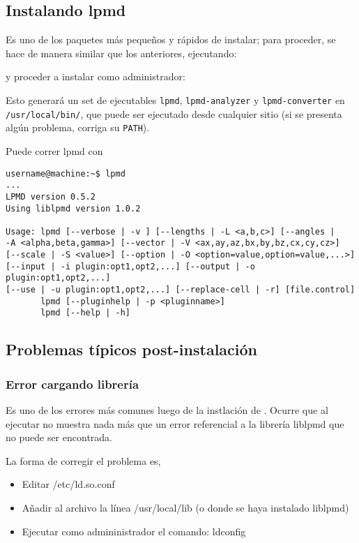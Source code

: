 \subsection{Instalando lpmd}

Es uno de los paquetes m\'as peque\~nos y r\'apidos de instalar; para proceder, se hace de manera similar que los anteriores, ejecutando:


y proceder a instalar como administrador:


Esto generar\'a un set de ejecutables \verb|lpmd|, \verb|lpmd-analyzer| y \verb|lpmd-converter| en \verb|/usr/local/bin/|, que puede ser ejecutado desde cualquier sitio (si se presenta alg\'un problema, corriga su \verb|PATH|).

Puede correr lpmd con

\begin{verbatim}
username@machine:~$ lpmd
...
LPMD version 0.5.2
Using liblpmd version 1.0.2

Usage: lpmd [--verbose | -v ] [--lengths | -L <a,b,c>] [--angles | 
-A <alpha,beta,gamma>] [--vector | -V <ax,ay,az,bx,by,bz,cx,cy,cz>] 
[--scale | -S <value>] [--option | -O <option=value,option=value,...>] 
[--input | -i plugin:opt1,opt2,...] [--output | -o plugin:opt1,opt2,...] 
[--use | -u plugin:opt1,opt2,...] [--replace-cell | -r] [file.control]
       lpmd [--pluginhelp | -p <pluginname>]
       lpmd [--help | -h]
\end{verbatim}

\subsection{Problemas t\'ipicos post-instalaci\'on}

\subsubsection{Error cargando librer\'ia}

Es uno de los errores m\'as comunes luego de la instlaci\'on de \lpmd. Ocurre que al ejecutar \lpmd no muestra nada m\'as que un error referencial a la librer\'ia liblpmd que no puede ser encontrada.

La forma de corregir el problema es,

\begin{itemize}
 \item Editar /etc/ld.so.conf
 \item A\~nadir al archivo la l\'inea /usr/local/lib (o donde se haya instalado liblpmd)
 \item Ejecutar como admininistrador el comando: ldconfig
\end{itemize}

